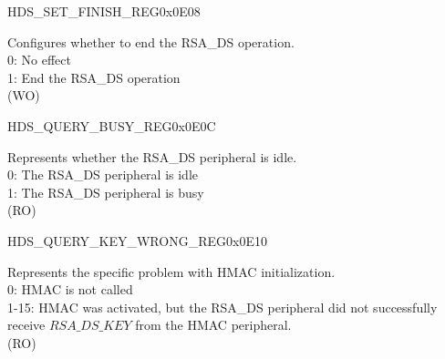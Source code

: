 \begin{register}{H}{DS\_SET\_FINISH\_REG}{0x0E08}\label{regdesc:DSSETFINISHREG}
%
%
\regnewline%
\begin{regdesc}\begin{reglist}
\item [DS\_SET\_FINISH] Configures whether to end the RSA\_DS operation. \\
0: No effect\\
1: End the RSA\_DS operation\\
(WO)
\end{reglist}\end{regdesc}
\end{register}


\begin{register}{H}{DS\_QUERY\_BUSY\_REG}{0x0E0C}\label{regdesc:DSQUERYBUSYREG}
%
%
\regnewline%
\begin{regdesc}\begin{reglist}
\item [DS\_QUERY\_BUSY] Represents whether the RSA\_DS peripheral is idle.\\
0: The RSA\_DS peripheral is idle\\
1: The RSA\_DS peripheral is busy\\
(RO)
\end{reglist}\end{regdesc}
\end{register}


\begin{register}{H}{DS\_QUERY\_KEY\_WRONG\_REG}{0x0E10}\label{regdesc:DSQUERYKEYWRONGREG}
%
%
\regnewline%
\begin{regdesc}\begin{reglist}
\item [DS\_QUERY\_KEY\_WRONG] Represents the specific problem with HMAC initialization.\\
0: HMAC is not called\\
1-15: HMAC was activated, but the RSA\_DS peripheral did not successfully receive \begin{math}RSA\_DS\_KEY\end{math} from the HMAC peripheral.\\
(RO)
\end{reglist}\end{regdesc}
\end{register}


